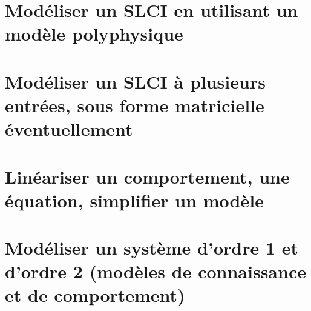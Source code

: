 \graphicspath{{\repStyle/png/}{../SLCI/SLCI-03-SchemaBlocs/71_Robovolc/images/}} 
 
 
\graphicspath{{\repStyle/png/}{../SLCI/SLCI-03-SchemaBlocs/77_ProtheseTibia/images/}} 
 
 
\graphicspath{{\repStyle/png/}{../SLCI/SLCI-03-SchemaBlocs/78_RobotDaVinci/images/}} 
 
 
\graphicspath{{\repStyle/png/}{../SLCI/SLCI-03-SchemaBlocs/79_Tuyere/images/}} 
 
 
\graphicspath{{\repStyle/png/}{../SLCI/SLCI-03-SchemaBlocs/80_Clever/images/}} 
 
 
\clearpage 
\newpage 
\section{Modéliser un SLCI en utilisant un modèle polyphysique} 
\clearpage 
\newpage 
\section{Modéliser un SLCI à plusieurs entrées, sous forme matricielle éventuellement} 
\clearpage 
\newpage 
\section{Linéariser un comportement, une équation, simplifier un modèle} 
\clearpage 
\newpage 
\section{Modéliser un système d'ordre 1 et d'ordre 2  (modèles de connaissance et de comportement)} 
\graphicspath{{\repStyle/png/}{../SLCI/SLCI-07-Ordre12/502_Divers/images/}} 
 
 
\graphicspath{{\repStyle/png/}{../SLCI/SLCI-07-Ordre12/503_Divers/images/}} 
 
 
\graphicspath{{\repStyle/png/}{../SLCI/SLCI-07-Ordre12/504_Divers/images/}} 
 
 
\graphicspath{{\repStyle/png/}{../SLCI/SLCI-07-Ordre12/506_Divers/images/}} 
 
 
